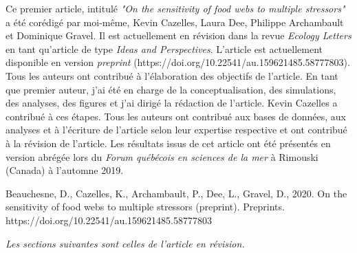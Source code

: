 Ce premier article, intitulé \textit{"On the sensitivity of food webs to multiple stressors"} a été corédigé par moi-même, Kevin Cazelles, Laura Dee, Philippe Archambault et Dominique Gravel. Il est actuellement en révision dans la revue \textit{Ecology Letters} en tant qu'article de type \textit{Ideas and Perspectives}. L'article est actuellement disponible en version \textit{preprint} (https://doi.org/10.22541/au.159621485.58777803). Tous les auteurs ont contribué à l'élaboration des objectifs de l'article. En tant que premier auteur, j'ai été en charge de la conceptualisation, des simulations, des analyses, des figures et j'ai dirigé la rédaction de l'article. Kevin Cazelles a contribué à ces étapes. Tous les auteurs ont contribué aux bases de données, aux analyses et à l'écriture de l'article selon leur expertise respective et ont contribué à la révision de l'article. Les résultats issus de cet article ont été présentés en version abrégée lors du \textit{Forum québécois en sciences de la mer} à Rimouski (Canada) à l'automne 2019. \linebreak[4]

\begin{singlespace}
Beauchesne, D., Cazelles, K., Archambault, P., Dee, L., Gravel, D., 2020. On the sensitivity of food webs to multiple stressors (preprint). Preprints. https://doi.org/10.22541/au.159621485.58777803
\end{singlespace}

\textit{Les sections suivantes sont celles de l’article en révision.}
